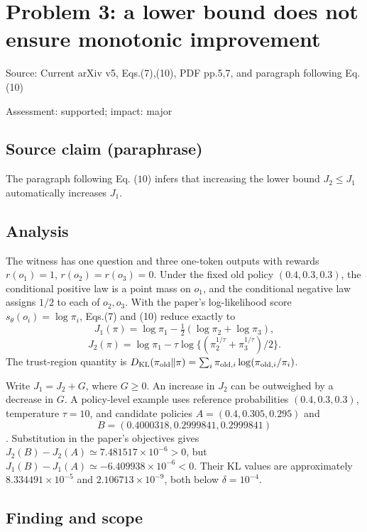\documentclass[11pt]{article}
\begin{document}
\section*{Problem 3: a lower bound does not ensure monotonic improvement}

Source: Current arXiv v5, Eqs.(7),(10), PDF pp.5,7, and paragraph following Eq.(10)

Assessment: supported; impact: major

\subsection*{Source claim (paraphrase)}

The paragraph following Eq. (\(10\)) infers that increasing the lower bound \(J_2\le J_1\) automatically increases \(J_1\).

\subsection*{Analysis}

The witness has one question and three one-token outputs with rewards \(r(o_1)=1\), \(r(o_2)=r(o_3)=0\). Under the fixed old policy \((0.4,0.3,0.3)\), the conditional positive law is a point mass on \(o_1\), and the conditional negative law assigns \(1/2\) to each of \(o_2,o_3\). With the paper’s log-likelihood score \(s_\theta(o_i)=\log\pi_i\), Eqs.(7) and (10) reduce exactly to \[J_1(\pi)=\log\pi_1-\tfrac12(\log\pi_2+\log\pi_3),\] \[J_2(\pi)=\log\pi_1-\tau\log\{(\pi_2^{1/\tau}+\pi_3^{1/\tau})/2\}.\] The trust-region quantity is \(D_{\rm KL}(\pi_{\rm old}\|\pi)=\sum_i\pi_{{\rm old},i}\log(\pi_{{\rm old},i}/\pi_i)\).

Write \(J_1=J_2+G\), where \(G\ge0\). An increase in \(J_2\) can be outweighed by a decrease in \(G\). A policy-level example uses reference probabilities \((0.4,0.3,0.3)\), temperature \(\tau=10\), and candidate policies \(A=(0.4,0.305,0.295)\) and \[B=(0.4000318,0.2999841,0.2999841)\]. Substitution in the paper's objectives gives \(J_2(B)-J_2(A)\simeq7.481517\times10^{-6}>0\), but \(J_1(B)-J_1(A)\simeq-6.409938\times10^{-6}<0\). Their KL values are approximately \(8.334491\times10^{-5}\) and \(2.106713\times10^{-9}\), both below \(\delta=10^{-4}\).

\subsection*{Finding and scope}
\end{document}
